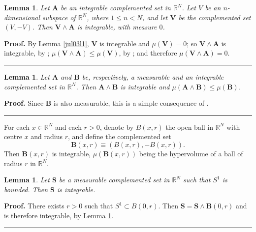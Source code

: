 \documentclass[11pt]{article}%
\newtheorem{lemma}[theorem]{Lemma}
\newenvironment{proof}[1][Proof]{\noindent\textbf{#1.} }{\ \rule{0.5em}{0.5em}}
\begin{document}
\begin{lemma}
\label{jul03l2}Let $\mathbf{A}$ be an integrable complemented set in
$\mathbb{R}^{N}$. Let $V$ be an $n$-dimensional subspace of $\mathbb{R}^{N}$,
where $1\leqslant n<N$, and let $\mathbf{V}$ be the complemented set $\left(
V,-V\right)  $. Then $\mathbf{V}\wedge\mathbf{A}$ is integrable, with measure
$0$.
\end{lemma}

\begin{proof}
By Lemma \ref{jul03l1}, $\mathbf{V}$ is integrable and $\mu(\mathbf{V})=0$; so
$\mathbf{V}\wedge\mathbf{A}$ is integrable, by \cite[Ch.6, (3.5)]{BB};
$\mu\left(  \mathbf{V}\wedge\mathbf{A}\right)  \leqslant\mu(\mathbf{V})$, by
\cite[Ch. 6, (3.7)]{BB}; and therefore $\mu\left(  \mathbf{V}\wedge
\mathbf{A}\right)  =0$.
\end{proof}

\begin{lemma}
\label{jul21l1}Let $\mathbf{A}$ and $\mathbf{B}$ be, respectively, a
measurable and an integrable complemented set in $\mathbb{R}^{N}$. Then
$\mathbf{A\wedge B}$ is integrable and $\mu(\mathbf{A\wedge B})\leqslant
\mu(\mathbf{B})$.
\end{lemma}

\begin{proof}
Since $\mathbf{B}$ is also measurable, this is a simple consequence of
\cite[Ch. 6, (7.7) and (7.11)]{BB}.
\end{proof}

%

\medskip


For each $x\in\mathbb{R}^{N}$ and each $r>0$, denote by $B(x,r)$ the open ball
in $\mathbb{R}^{N}$ with centre $x$ and radius $r$, and define the
complemented set%
\[
\mathbf{B}(x,r)\equiv\left(  B(x,r),-B(x,r)\right)  .
\]
Then $\mathbf{B}(x,r)$ is integrable, $\mu(\mathbf{B}(x,r))$ being the
hypervolume of a ball of radius $r$ in $\mathbb{R}^{N}$.

\begin{lemma}
\label{jul22l1}Let $\mathbf{S}$ be a measurable complemented set in
$\mathbb{R}^{N}$ such that $S^{1}$ is bounded. Then $\mathbf{S}$ is integrable.
\end{lemma}

\begin{proof}
There exists $r>0$ such that $S^{1}\subset B(0,r)$. Then $\mathbf{S}%
=\mathbf{S\wedge B}(0,r)$ and is therefore integrable, by Lemma \ref{jul21l1}.
\end{proof}
\end{document}
